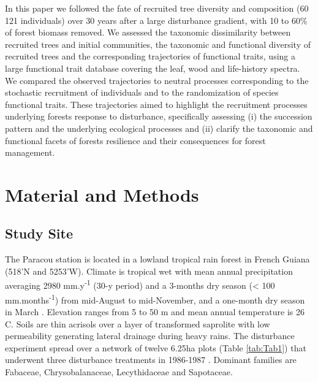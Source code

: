 \documentclass[fleqn,10pt]{ArtEcoFoG} %
\begin{document}
In this paper we followed the fate of recruited tree diversity and
composition (60 121 individuals) over 30 years after a large disturbance
gradient, with 10 to 60\% of forest biomass removed. We assessed the
taxonomic dissimilarity between recruited trees and initial communities,
the taxonomic and functional diversity of recruited trees and the
corresponding trajectories of functional traits, using a large
functional trait database covering the leaf, wood and life-history
spectra. We compared the observed trajectories to neutral processes
corresponding to the stochastic recruitment of individuals and to the
randomization of species functional traits. These trajectories aimed to
highlight the recruitment processes underlying forests response to
disturbance, specifically assessing (i) the succession pattern and the
underlying ecological processes and (ii) clarify the taxonomic and
functional facets of forests resilience and their consequences for
forest management.

\section{Material and Methods}\label{material-and-methods}

\subsection{Study Site}\label{study-site}

The Paracou station is located in a lowland tropical rain forest in
French Guiana (518'N and 5253'W). Climate is tropical wet with mean
annual precipitation averaging 2980 mm.y\textsuperscript{-1} (30-y
period) and a 3-months dry season (\textless{} 100
mm.months\textsuperscript{-1}) from mid-August to mid-November, and a
one-month dry season in March \citep{Wagner2011}. Elevation ranges from
5 to 50 m and mean annual temperature is 26 C. Soils are thin acrisols
over a layer of transformed saprolite with low permeability generating
lateral drainage during heavy rains. The disturbance experiment spread
over a network of twelve 6.25ha plots (Table \ref{tab:Tab1}) that
underwent three disturbance treatments in 1986-1987 \citep{Herault2018}.
Dominant families are Fabaceae, Chrysobalanaceae, Lecythidaceae and
Sapotaceae.
\end{document}
